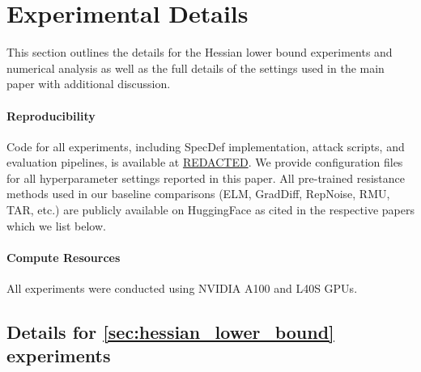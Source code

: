 \documentclass{article}
\theoremstyle{plain}
\theoremstyle{definition}
\theoremstyle{remark}
\begin{document}
\section{Experimental Details}
\label{app:experimental-details}

This section outlines the details for the Hessian lower bound experiments and numerical analysis as well as the full details of the settings used in the main paper with additional discussion. 

\paragraph{Reproducibility} Code for all experiments, including SpecDef implementation, attack scripts, and evaluation pipelines, is available at \url{REDACTED}. We provide configuration files for all hyperparameter settings reported in this paper. All pre-trained resistance methods used in our baseline comparisons (ELM, GradDiff, RepNoise, RMU, TAR, etc.) are publicly available on HuggingFace as cited in the respective papers which we list below.

\paragraph{Compute Resources} All experiments were conducted using NVIDIA A100 and L40S GPUs. %

\subsection{Details for \cref{sec:hessian_lower_bound} experiments}

\end{document}
